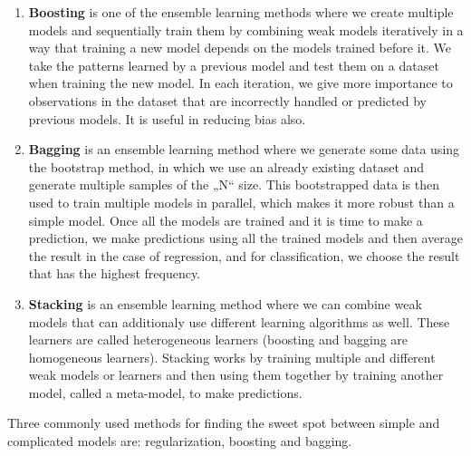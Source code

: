 \documentclass[
  letterpaper,
]{book}
\providecommand{\tightlist}{%
  \setlength{\itemsep}{0pt}\setlength{\parskip}{0pt}}\usepackage{longtable,booktabs,array}
\begin{document}
\begin{itemize}
  \begin{enumerate}
  \def\labelenumi{\arabic{enumi}.}
  \tightlist
  \item
    \textbf{Boosting} is one of the ensemble learning methods where we
    create multiple models and sequentially train them by combining weak
    models iteratively in a way that training a new model depends on the
    models trained before it. We take the patterns learned by a previous
    model and test them on a dataset when training the new model. In
    each iteration, we give more importance to observations in the
    dataset that are incorrectly handled or predicted by previous
    models. It is useful in reducing bias also.
  \item
    \textbf{Bagging} is an ensemble learning method where we generate
    some data using the bootstrap method, in which we use an already
    existing dataset and generate multiple samples of the „N`` size.
    This bootstrapped data is then used to train multiple models in
    parallel, which makes it more robust than a simple model. Once all
    the models are trained and it is time to make a prediction, we make
    predictions using all the trained models and then average the result
    in the case of regression, and for classification, we choose the
    result that has the highest frequency.
  \item
    \textbf{Stacking} is an ensemble learning method where we can
    combine weak models that can additionaly use different learning
    algorithms as well. These learners are called heterogeneous learners
    (boosting and bagging are homogeneous learners). Stacking works by
    training multiple and different weak models or learners and then
    using them together by training another model, called a meta-model,
    to make predictions.
  \end{enumerate}
\end{itemize}

Three commonly used methods for finding the sweet spot between simple
and complicated models are: regularization, boosting and bagging.
\end{document}
